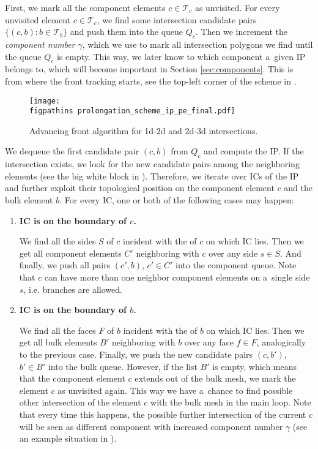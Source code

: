 First, we mark all the component elements $c\in\mathcal T_c$ as unvisited. 
For every unvisited element $c\in \mathcal T_c$, 
we find some intersection candidate pairs $\{(c,b): b\in\mathcal T_b\}$ and
push them into the queue $Q_c$.
Then we increment the \emph{component number} $\gamma$, which we use to 
mark all intersection polygons we find until the queue $Q_c$ is empty.
This way, we later know to which component a~given IP belongs to, 
which will become important in Section \ref{sec:components}.
This is from where the front tracking starts, see the top-left corner of the scheme in 
.
%
\begin{figure}[!htb]
  \centering    
    \texttt{[image: \\figpathins prolongation\_scheme\_ip\_pe\_final.pdf]}
  \caption{Advancing front algorithm for 1d-2d and 2d-3d intersections.}
  \label{fig:prolongation}
\end{figure}

We dequeue the first candidate pair $(c,b)$ from $Q_c$ and compute the IP.
If the intersection exists, we look for the new candidate pairs among the neighboring elements
(see the big white block in ).
Therefore, we iterate over ICs of the IP and further exploit their topological position on the component element $c$ and the bulk element $b$.
For every IC, one or both of the following cases may happen:
\begin{enumerate}[label=(\alph*)]
    \item \textbf{IC is on the boundary of $c$.}
    
            We find all the sides $S$ of $c$ incident with the \nface of $c$ on which IC lies. Then we get all component
            elements $C'$ neighboring with $c$ over any side $s\in S$. And finally, we push all pairs $(c',b)$, $c'\in C'$ 
            into the component queue. Note that $c$ can have more than one neighbor component elements on a~single side $s$, i.e. branches are allowed.
    \item \textbf{IC is on the boundary of $b$.} \label{enum:prolong2}
    
            We find all the faces $F$ of $b$ incident with the \nface of $b$ on which IC lies. 
            Then we get all bulk elements $B'$ neighboring with $b$ over any face $f\in F$,
            analogically to the previous case.
            Finally, we push the new candidate pairs $(c, b')$, $b'\in B'$ into the bulk queue.
            However, if the list $B'$ is empty, which means that the component element $c$ extends out of the bulk mesh,
            we mark the element $c$ as unvisited again. This way we have a~chance to find possible other intersection of the element
            $c$ with the bulk mesh in the main loop. Note that every time this happens, the possible further intersection 
            of the current $c$ will be seen as different component with increased component number $\gamma$
            (see an example situation in ). 
\end{enumerate}

